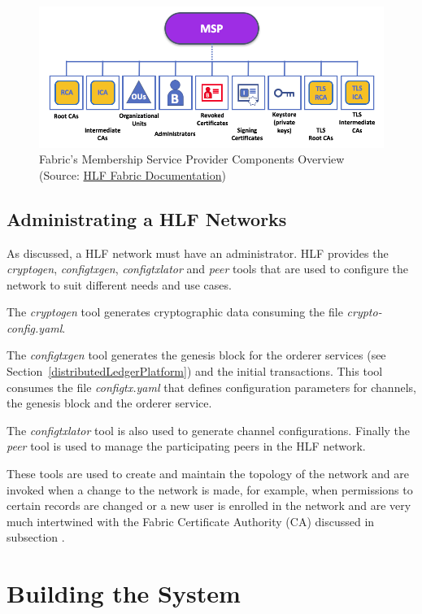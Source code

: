 \begin{figure}[ht] 
  \centering
  \includegraphics[width=0.9\linewidth]{imgs/membershipFabric.png}
  \caption{\label{fig:membershipFabric}Fabric's Membership Service Provider
  Components Overview (Source:
  \href{https://hyperledger-fabric.readthedocs.io/en/release-1.2/ledger/ledger.html}{HLF
  Fabric Documentation})}
\end{figure}

\subsection{Administrating a HLF Networks}

As discussed, a HLF network must have an administrator. HLF provides the
\textit{cryptogen}, \textit{configtxgen}, \textit{configtxlator} and
\textit{peer} tools that are used to configure the network to suit different
needs and use cases.

The \textit{cryptogen} tool generates cryptographic data consuming the file
\textit{crypto-config.yaml}.

The \textit{configtxgen} tool generates the genesis block for the orderer
services (see Section~\ref{distributedLedgerPlatform}) and the initial transactions.  This tool consumes the file
\textit{configtx.yaml} that defines configuration parameters for channels, the
genesis block and the orderer service.

The \textit{configtxlator} tool is also used to generate channel
configurations.  Finally the \textit{peer} tool is used to manage the
participating peers in the HLF network.

These tools are used to create and maintain the topology of the network and are
invoked when a change to the network is made, for example, when permissions to
certain records are changed or a new user is enrolled in the network and are
very much intertwined with the Fabric Certificate Authority (CA) discussed in
subsection .

\section{Building the System}

